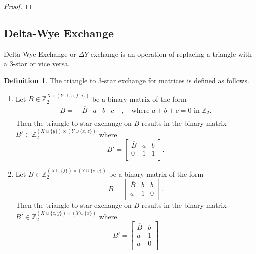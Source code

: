 \documentclass{article}
\theoremstyle{definition}
\newtheorem{definition}{Definition}
\begin{document}
\begin{proof}
\end{proof}


\subsection{Delta-Wye Exchange}

Delta-Wye Exchange or $\Delta Y$-exchange is an operation of replacing a triangle with a 3-star or vice versa.

\begin{definition}\label{def:triangle_star_exchange}
    The triangle to 3-star exchange for matrices is defined as follows.
    \begin{enumerate}
        \item Let $B \in \mathbb{Z}_{2}^{X \times (Y \cup \{e, f, g\})}$ be a binary matrix of the form
        \[
            B = \begin{bmatrix}
                \overline{B} & a & b & c \\
            \end{bmatrix}
            , \quad
            \text{where $a + b + c = 0$ in $\mathbb{Z}_{2}$.}
        \]
        Then the triangle to star exchange on $B$ results in the binary matrix $B' \in \mathbb{Z}_{2}^{(X \cup \{y\}) \times (Y \cup \{x, z\})}$ where
        \[
            B' = \begin{bmatrix}
                \overline{B} & a & b \\
                0 & 1 & 1 \\
            \end{bmatrix}.
        \]
        \item Let $B \in \mathbb{Z}_{2}^{(X \cup \{f\}) \times (Y \cup \{e, g\})}$ be a binary matrix of the form
        \[
            B = \begin{bmatrix}
                \overline{B} & b & b \\
                a & 1 & 0 \\
            \end{bmatrix}.
        \]
        Then the triangle to star exchange on $B$ results in the binary matrix $B' \in \mathbb{Z}_{2}^{(X \cup \{z, y\}) \times (Y \cup \{x\})}$ where
        \[
            B' = \begin{bmatrix}
                \overline{B} & b \\
                a & 1 \\
                a & 0 \\

\end{bmatrix}\]
\end{enumerate}
\end{definition}
\end{document}
